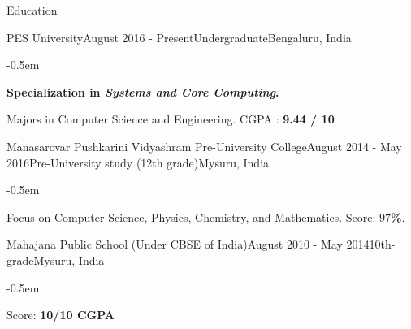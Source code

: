 \documentclass{CV} %
\begin{document}

\begin{rSection}{Education}


  \begin{rSubsection}{PES University}{August 2016 - Present}{Undergraduate}{Bengaluru, India}
    \begin{list}{}{\footnotesize}\itemsep -0.5em \vspace{-0.5em}
      \item {\bf Specialization in \textit{Systems and Core Computing}.}
      \item Majors in Computer Science and Engineering. CGPA : {\bf 9.44 / 10}
    \end{list}
  \end{rSubsection}
  
  \begin{rSubsection}{Manasarovar Pushkarini Vidyashram Pre-University College}{August 2014 - May 2016}{Pre-University study \tiny{(12th grade)}}{Mysuru, India}
    \begin{list}{}{\footnotesize}\itemsep -0.5em \vspace{-0.5em}
      \item Focus on Computer Science, Physics, Chemistry, and Mathematics. Score: {\bf $97$\%}.
    \end{list}
  \end{rSubsection}

  \newpage
  
  \begin{rSubsection}{Mahajana Public School \scriptsize{(Under CBSE of India)}}{August 2010 - May 2014}{10th-grade}{Mysuru, India}
    \begin{list}{}{\footnotesize}\itemsep -0.5em \vspace{-0.5em}
      \item Score: {\bf 10/10 CGPA}
    \end{list}
  \end{rSubsection}

\end{rSection}


\end{document}
